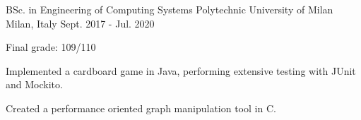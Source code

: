 \begin{cventries}
  
  \cventry
    {BSc. in Engineering of Computing Systems } %
    {Polytechnic University of Milan} %
    {Milan, Italy} %
    {Sept. 2017 - Jul. 2020} %
    {
      \begin{cvitems} %
        \item {Final grade: 109/110}
        \item {Implemented a cardboard game in Java, performing extensive testing with JUnit and Mockito.}
        \item {Created a performance oriented graph manipulation tool in C.}
      \end{cvitems}
    }
    
    

\end{cventries}
